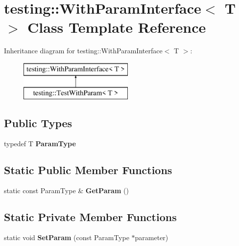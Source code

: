 \hypertarget{classtesting_1_1_with_param_interface}{}\section{testing\+:\+:With\+Param\+Interface$<$ T $>$ Class Template Reference}
\label{classtesting_1_1_with_param_interface}
Inheritance diagram for testing\+:\+:With\+Param\+Interface$<$ T $>$\+:\begin{figure}[H]
\begin{center}
\leavevmode
\includegraphics[height=2.000000cm]{classtesting_1_1_with_param_interface}
\end{center}
\end{figure}
\subsection*{Public Types}
\begin{DoxyCompactItemize}
\item 
\mbox{\label{classtesting_1_1_with_param_interface_a343febaaebf1f025bda484f841d4fec1}} 
typedef T {\bfseries Param\+Type}
\end{DoxyCompactItemize}
\subsection*{Static Public Member Functions}
\begin{DoxyCompactItemize}
\item 
\mbox{\label{classtesting_1_1_with_param_interface_a1078d4493d7aa4d3e50d1d6c661bee4d}} 
static const Param\+Type \& {\bfseries Get\+Param} ()
\end{DoxyCompactItemize}
\subsection*{Static Private Member Functions}
\begin{DoxyCompactItemize}
\item 
\mbox{\label{classtesting_1_1_with_param_interface_a471e12a61e83347675b649465bc5aabc}} 
static void {\bfseries Set\+Param} (const Param\+Type $\ast$parameter)
\end{DoxyCompactItemize}
